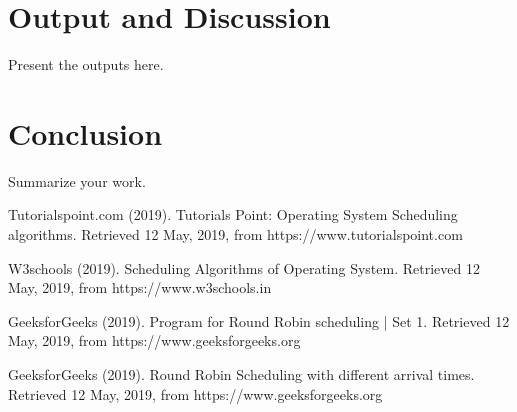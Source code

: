 \documentclass[12pt]{article}
\begin{document}
\newpage
\section{Output and Discussion}
Present the outputs here.

\newpage
\section{Conclusion}
Summarize your work.


\newpage



Tutorialspoint.com (2019). Tutorials Point: Operating System Scheduling
algorithms. Retrieved 12 May, 2019, from https://www.tutorialspoint.com

W3schools (2019). Scheduling Algorithms of Operating System. Retrieved 12 May,
2019, from https://www.w3schools.in

GeeksforGeeks (2019). Program for Round Robin scheduling | Set 1. Retrieved 12
May, 2019, from https://www.geeksforgeeks.org

GeeksforGeeks (2019). Round Robin Scheduling with different arrival times.
Retrieved 12 May, 2019, from https://www.geeksforgeeks.org
\end{document}
